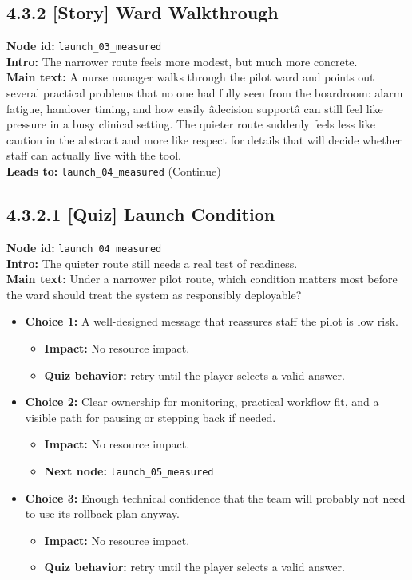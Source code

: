\documentclass[11pt]{article}
\begin{document}
\subsection*{4.3.2 [Story] Ward Walkthrough}
\textbf{Node id:} \texttt{launch\_03\_measured}\\
\textbf{Intro:} The narrower route feels more modest, but much more concrete.\\
\textbf{Main text:} A nurse manager walks through the pilot ward and points out several practical problems that no one had fully seen from the boardroom: alarm fatigue, handover timing, and how easily âdecision supportâ can still feel like pressure in a busy clinical setting. The quieter route suddenly feels less like caution in the abstract and more like respect for details that will decide whether staff can actually live with the tool.\\
\textbf{Leads to:} \texttt{launch\_04\_measured} (Continue)\\
\subsection*{4.3.2.1 [Quiz] Launch Condition}
\textbf{Node id:} \texttt{launch\_04\_measured}\\
\textbf{Intro:} The quieter route still needs a real test of readiness.\\
\textbf{Main text:} Under a narrower pilot route, which condition matters most before the ward should treat the system as responsibly deployable?\\
\begin{itemize}
\item \textbf{Choice 1:} A well-designed message that reassures staff the pilot is low risk.
\begin{itemize}
\item \textbf{Impact:} No resource impact.
\item \textbf{Quiz behavior:} retry until the player selects a valid answer.
\end{itemize}
\item \textbf{Choice 2:} Clear ownership for monitoring, practical workflow fit, and a visible path for pausing or stepping back if needed.
\begin{itemize}
\item \textbf{Impact:} No resource impact.
\item \textbf{Next node:} \texttt{launch\_05\_measured}
\end{itemize}
\item \textbf{Choice 3:} Enough technical confidence that the team will probably not need to use its rollback plan anyway.
\begin{itemize}
\item \textbf{Impact:} No resource impact.
\item \textbf{Quiz behavior:} retry until the player selects a valid answer.
\end{itemize}
\end{itemize}
\end{document}
